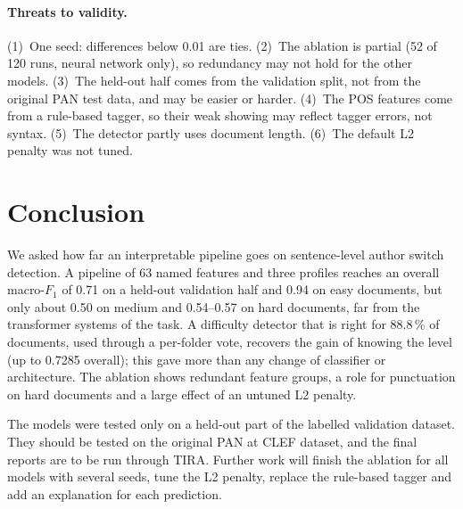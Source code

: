 \documentclass[runningheads]{llncs}
\begin{document}
\paragraph{Threats to validity.} (1)~One seed: differences below 0.01 are ties. (2)~The ablation is partial (52 of 120 runs, neural network only), so redundancy may not hold for the other models. (3)~The held-out half comes from the validation split, not from the original PAN test data, and may be easier or harder. (4)~The POS features come from a rule-based tagger, so their weak showing may reflect tagger errors, not syntax. (5)~The detector partly uses document length. (6)~The default L2 penalty was not tuned.

\section{Conclusion}

We asked how far an interpretable pipeline goes on sentence-level author switch detection. A pipeline of 63 named features and three profiles reaches an overall macro-$F_1$ of 0.71 on a held-out validation half and 0.94 on easy documents, but only about 0.50 on medium and 0.54--0.57 on hard documents, far from the transformer systems of the task. A difficulty detector that is right for 88.8\,\% of documents, used through a per-folder vote, recovers the gain of knowing the level (up to 0.7285 overall); this gave more than any change of classifier or architecture. The ablation shows redundant feature groups, a role for punctuation on hard documents and a large effect of an untuned L2 penalty.

The models were tested only on a held-out part of the labelled validation dataset. They should be tested on the original PAN at CLEF dataset, and the final reports are to be run through TIRA. Further work will finish the ablation for all models with several seeds, tune the L2 penalty, replace the rule-based tagger and add an explanation for each prediction.



\end{document}

